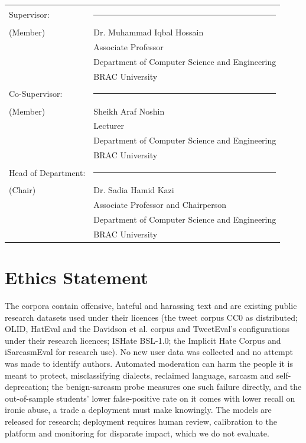 \vspace{1.2cm}
\noindent\begin{tabular}{@{}p{4.6cm}l@{}}
Supervisor: & \rule{7cm}{0.4pt}\\
(Member) & Dr. Muhammad Iqbal Hossain\\
 & Associate Professor\\
 & Department of Computer Science and Engineering\\
 & BRAC University\\[1.4cm]
Co-Supervisor: & \rule{7cm}{0.4pt}\\
(Member) & Sheikh Araf Noshin\\
 & Lecturer\\
 & Department of Computer Science and Engineering\\
 & BRAC University\\[1.4cm]
Head of Department: & \rule{7cm}{0.4pt}\\
(Chair) & Dr. Sadia Hamid Kazi\\
 & Associate Professor and Chairperson\\
 & Department of Computer Science and Engineering\\
 & BRAC University
\end{tabular}

\chapter*{Ethics Statement}
The corpora contain offensive, hateful and harassing text and are existing public research datasets
used under their licences (the tweet corpus CC0 as distributed; OLID, HatEval and the Davidson et
al. corpus and TweetEval's configurations under their research licences; ISHate BSL-1.0; the
Implicit Hate Corpus and iSarcasmEval for research use). No new user data was collected and no
attempt was made to identify authors. Automated moderation can harm the people it is meant to
protect, misclassifying dialects, reclaimed language, sarcasm and self-deprecation; the
benign-sarcasm probe measures one such failure directly, and the out-of-sample students' lower
false-positive rate on it comes with lower recall on ironic abuse, a trade a deployment must make
knowingly. The models are released for research; deployment requires human review, calibration to
the platform and monitoring for disparate impact, which we do not evaluate.

